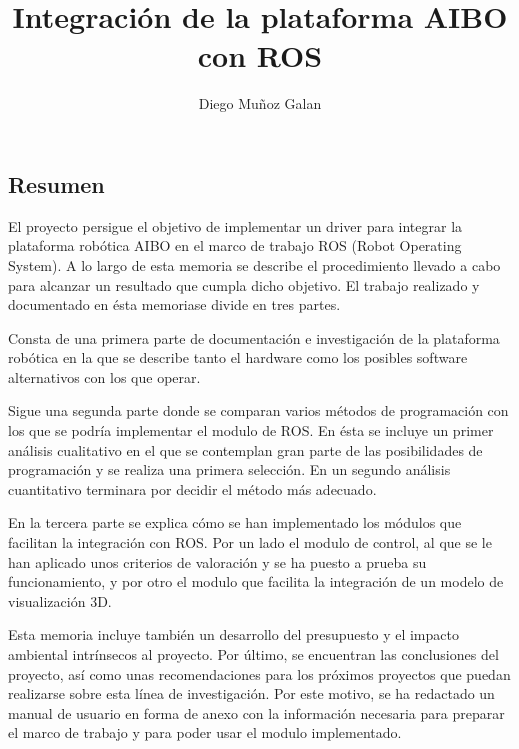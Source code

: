 \documentclass[12pt,a4paper,final,twoside]{book}
\title{Integración de la plataforma AIBO con ROS}
\author{Diego Muñoz Galan}
\begin{document}
\maketitle
\thispagestyle{empty}

\newpage
\paragraph{}
\thispagestyle{empty}
\cleardoublepage

\setcounter{page}{1}
\begin{center}
\chapter*{Resumen}
\end{center}
\thispagestyle{fancy}
El proyecto persigue el objetivo de implementar un driver para integrar la plataforma robótica AIBO en el marco de trabajo ROS (Robot Operating System). A lo largo de esta memoria se describe el procedimiento llevado a cabo para alcanzar un resultado que cumpla dicho objetivo. 
El trabajo realizado y documentado en ésta memoriase divide en tres partes.

Consta de una primera parte de documentación e investigación de la plataforma robótica en la que se describe tanto el hardware como los posibles software alternativos con los que operar.

Sigue una segunda parte donde se comparan varios métodos de programación con los que se podría implementar el modulo de ROS. En ésta se incluye un primer análisis cualitativo en el que se contemplan gran parte de las posibilidades de programación y se realiza una primera selección. En un segundo análisis cuantitativo terminara por decidir el método más adecuado.

En la tercera parte se explica cómo se han implementado los módulos que facilitan la integración con ROS. Por un lado el modulo de control, al que se le han aplicado unos criterios de valoración y se ha puesto a prueba su funcionamiento, y por otro el modulo que facilita la integración de un modelo de visualización 3D.

Esta memoria incluye también un desarrollo del presupuesto y el impacto ambiental intrínsecos al proyecto. Por último, se encuentran las conclusiones del proyecto, así como unas recomendaciones para los próximos proyectos que puedan realizarse sobre esta línea de investigación.
Por este motivo, se ha redactado un manual de usuario en forma de anexo con la información necesaria para preparar el marco de trabajo y para poder usar el modulo implementado.
\end{document}
